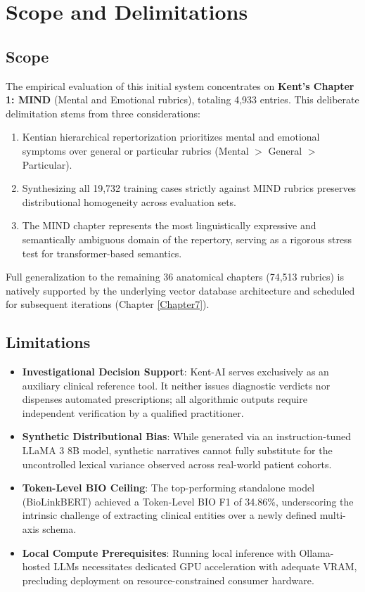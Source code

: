 
\section{Scope and Delimitations}

\subsection{Scope}

The empirical evaluation of this initial system concentrates on \textbf{Kent's Chapter 1: MIND} (Mental and Emotional rubrics), totaling 4,933 entries. This deliberate delimitation stems from three considerations:
\begin{enumerate}
  \item Kentian hierarchical repertorization prioritizes mental and emotional symptoms over general or particular rubrics (Mental $>$ General $>$ Particular).
  \item Synthesizing all 19,732 training cases strictly against MIND rubrics preserves distributional homogeneity across evaluation sets.
  \item The MIND chapter represents the most linguistically expressive and semantically ambiguous domain of the repertory, serving as a rigorous stress test for transformer-based semantics.
\end{enumerate}

Full generalization to the remaining 36 anatomical chapters (74,513 rubrics) is natively supported by the underlying vector database architecture and scheduled for subsequent iterations (Chapter \ref{Chapter7}).

\subsection{Limitations}

\begin{itemize}
  \item \textbf{Investigational Decision Support}: Kent-AI serves exclusively as an auxiliary clinical reference tool. It neither issues diagnostic verdicts nor dispenses automated prescriptions; all algorithmic outputs require independent verification by a qualified practitioner.
  \item \textbf{Synthetic Distributional Bias}: While generated via an instruction-tuned LLaMA 3 8B model, synthetic narratives cannot fully substitute for the uncontrolled lexical variance observed across real-world patient cohorts.
  \item \textbf{Token-Level BIO Ceiling}: The top-performing standalone model (BioLinkBERT) achieved a Token-Level BIO F1 of 34.86\%, underscoring the intrinsic challenge of extracting clinical entities over a newly defined multi-axis schema.
  \item \textbf{Local Compute Prerequisites}: Running local inference with Ollama-hosted LLMs necessitates dedicated GPU acceleration with adequate VRAM, precluding deployment on resource-constrained consumer hardware.
\end{itemize}


